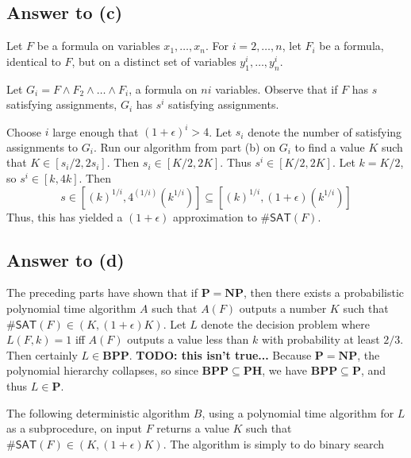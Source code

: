 \documentclass{article}
\renewcommand{\P}{\mathbf{P}}
\newcommand{\NP}{\mathbf{NP}}
\newcommand{\BPP}{\mathbf{BPP}}
\newcommand{\PH}{\mathbf{PH}}
\def \eps {{\varepsilon}}
\begin{document}
\subsection*{Answer to (c)}

Let $F$ be a formula on variables $x_1, \dots, x_n$.
For $i = 2, \dots, n$, let $F_i$ be a formula, identical to $F$, but on a distinct set of variables $y^i_1, \dots, y^i_n$.

Let $G_i = F \wedge F_2 \wedge \dots \wedge F_i$, a formula on $ni$ variables.
Observe that if $F$ has $s$ satisfying assignments, $G_i$ has $s^i$ satisfying assignments.

Choose $i$ large enough that $(1 + \epsilon)^i > 4$.
Let $s_i$ denote the number of satisfying assignments to $G_i$.
Run our algorithm from part (b) on $G_i$ to find a value $K$ such that
$K \in [s_i/2, 2s_i]$.
Then $s_i \in [K/2, 2K]$.
Thus $s^i \in [K/2, 2K]$.
Let $k = K/2$, so $s^i \in [k, 4k]$.
Then $$s \in [(k)^{1/i}, 4^{(1/i)}(k^{1/i})] \subseteq [(k)^{1/i}, (1 + \epsilon)(k^{1/i})]$$
Thus, this has yielded a $(1 + \epsilon)$ approximation to $\#\mathsf{SAT}(F)$.

\subsection*{Answer to (d)}
The preceding parts have shown that if $\P = \NP$, then there exists a probabilistic polynomial time algorithm $A$ such that $A(F)$ outputs a number $K$ such that $\#\mathsf{SAT}(F) \in (K, (1 + \epsilon) K)$.
Let $L$ denote the decision problem where $L(F, k) = 1$ iff $A(F)$ outputs a value less than $k$ with probability at least $2/3$.
Then certainly $L \in \BPP$. \textbf{TODO: this isn't true...}
Because $\P = \NP$, the polynomial hierarchy collapses, so since $\BPP \subseteq \PH$,
we have $\BPP \subseteq \P$, and thus $L \in \P$.

The following deterministic algorithm $B$, using a polynomial time algorithm for $L$ as a subprocedure, on input $F$ returns a value $K$ such that $\#\mathsf{SAT}(F) \in (K, (1 + \epsilon) K)$.
The algorithm is simply to do binary search 




\end{document}
